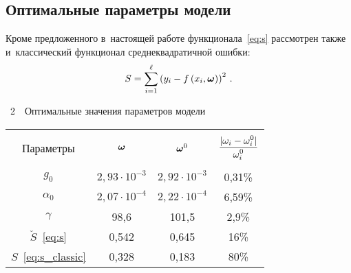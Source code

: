 \begin{multicols}{2}
\subsection{Оптимальные параметры модели}

Кроме предложенного в~настоящей работе функционала~\eqref{eq:s} рассмотрен
также и~классический функционал среднеквадратичной ошибки:
\begin{equation}
  S = \sum\limits_{i = 1}^\ell \left(y_i - f\left(x_i, \boldsymbol{\omega}\right)\right)^2\,.
  \label{eq:s_classic}
\end{equation}

 {\small \begin{center}  %
 \noindent
{{\tablename~2}\ \ \small{Оптимальные значения параметров модели}}


\vspace*{2ex}


    \begin{tabular}{|c|c|c|c|}
    \hline
    &&&\\[-9pt]
              Параметры  &  $\boldsymbol{\omega}$    &$\boldsymbol{\omega}^0$   & $\displaystyle\frac{\displaystyle |\omega_i - \omega^0_i|\mathstrut}{\displaystyle \omega^0_i\mathstrut}$\\
              \hline
            &&&\\[-9pt]
$g_0$ &  $2{,}93\cdot 10^{-3}$ & $2{,}92\cdot 10^{-3}$ & 0,31\%\\
$\alpha_0$   &$2{,}07\cdot 10^{-4}$& $2{,}22\cdot 10^{-4}$& 6,59\%\\
 $\gamma$      & 98,6& 101,5& 2,9\%\hphantom{9}\\
        $\breve{S}$~\eqref{eq:s} &  0,542& 0,645& 16\%\hphantom{999}\\
        $S$~\eqref{eq:s_classic} & 0,328& 0,183& 80\%\hphantom{999}\\ 
        \hline
  \end{tabular}
  \end{center}
  }


\vspace*{3pt}

\addtocounter{table}{1}

{ \begin{center}  %
 \vspace*{1pt}
 \mbox{%
\epsfxsize=77.694mm
}
\end{center}

\vspace*{-1pt}


}
\end{multicols}
